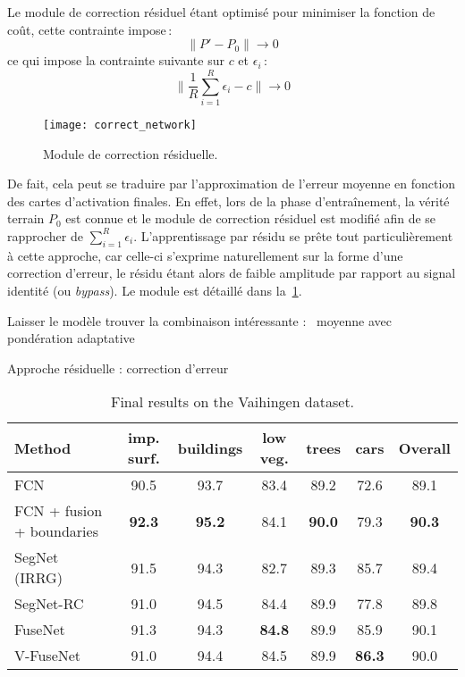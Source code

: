 Le module de correction résiduel étant optimisé pour minimiser la fonction de coût, cette contrainte impose\,:
\begin{equation}
\lVert P' - P_0 \rVert \rightarrow 0
\end{equation}
ce qui impose la contrainte suivante sur $c$ et $\epsilon_i$\,:
\begin{equation}
\lVert \frac{1}{R} \sum_{i=1}^R \epsilon_i - c \rVert \rightarrow 0
\end{equation}

\begin{figure}[t]
  \texttt{[image: correct\_network]}
  \caption{Module de correction résiduelle.}
  \label{fig:correction_network}
\end{figure}

De fait, cela peut se traduire par l'approximation de l'erreur moyenne en fonction des cartes d'activation finales. En effet, lors de la phase d'entraînement, la vérité terrain $P_0$ est connue et le module de correction résiduel est modifié afin de se rapprocher de $\sum_{i=1}^R \epsilon_i$. L'apprentissage par résidu se prête tout particulièrement à cette approche, car celle-ci s'exprime naturellement sur la forme d'une correction d'erreur, le résidu étant alors de faible amplitude par rapport au signal identité (ou \emph{bypass}). Le module est détaillé dans la~\cref{fig:correction_network}.

Laisser le modèle trouver la combinaison intéressante : ~moyenne avec pondération adaptative

Approche résiduelle : correction d'erreur

\begin{table}
    \caption{Final results on the Vaihingen dataset.}
    \label{table:final_vaihingen}
    \setlength\tabcolsep{5pt}
	\begin{tabularx}{\textwidth}{Y c c c c c c}
    \toprule
	Method & imp. surf. & buildings & low veg. & trees & cars & Overall\\
    \midrule
    FCN~\cite{sherrah_fully_2016} & 90.5 & 93.7 & 83.4 & 89.2 & 72.6 & 89.1\\
    FCN + fusion + boundaries~\cite{marmanis_classification_2016} & \textbf{92.3} & \textbf{95.2} & 84.1 & \textbf{90.0} & 79.3 & \textbf{90.3}\\
    \midrule
    SegNet (IRRG) & 91.5 & 94.3 & 82.7 & 89.3 & 85.7 & 89.4\\
	SegNet-RC & 91.0 & 94.5 & 84.4 & 89.9 & 77.8 & 89.8\\
    FuseNet & 91.3 & 94.3 & \textbf{84.8} & 89.9 & 85.9 & 90.1\\
    V-FuseNet & 91.0 & 94.4 & 84.5 & 89.9 & \textbf{86.3} & 90.0\\
    \bottomrule
    \end{tabularx}
\end{table}

